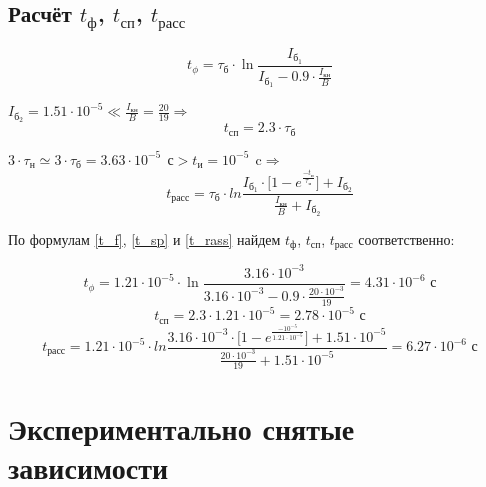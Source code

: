 \subsection{Расчёт $t_\text{ф}$, $t_\text{сп}$, $t_\text{расс}$}

\begin{equation}
\label{t_f}
t_\phi = \tau_{\text{б}} \cdot \ln{\frac{I_{\text{б}_1}}{I_{\text{б}_1} - 0.9 \cdot \frac{I_\text{кн}}{B}}}
\end{equation}

$I_{\text{б}_2} = 1.51 \cdot 10^{-5} \ll \frac{I_\text{кн}}{B} = \frac{20}{19} \Rightarrow$
\begin{equation}
\label{t_sp}
t_\text{сп} = 2.3 \cdot \tau_\text{б}
\end{equation}

$3 \cdot \tau_\text{н} \simeq 3 \cdot \tau_{\text{б}} = 3.63 \cdot 10^{-5}\ \ \text{с} > t_\text{и} = 10^{-5}\ \ \text{c} \Rightarrow$
\begin{equation}
\label{t_rass}
t_\text{расс} = \tau_{\text{б}} \cdot ln{\frac{I_{\text{б}_1} \cdot \Big [ 1 - e^{\frac{-t_\text{и}}{\tau_\text{н}}} \Big ] + I_{\text{б}_2}}{\frac{I_\text{кн}}{B} + I_{\text{б}_2}}}
\end{equation}

По формулам \ref{t_f}, \ref{t_sp} и \ref{t_rass} найдем $t_\text{ф}$, $t_\text{сп}$, $t_\text{расс}$ соответственно:

\begin{displaymath}
t_\phi = 1.21 \cdot 10^{-5} \cdot \ln{\frac{3.16 \cdot 10^{-3}}{3.16 \cdot 10^{-3} - 0.9 \cdot \frac{20 \cdot 10^{-3}}{19}}} = 4.31 \cdot 10^{-6} \text{ с}
\end{displaymath}
\begin{displaymath}
t_\text{сп} = 2.3 \cdot 1.21 \cdot 10^{-5} = 2.78 \cdot 10^{-5} \text{ с}
\end{displaymath}
\begin{displaymath}
t_\text{расс} = 1.21 \cdot 10^{-5} \cdot ln{\frac{3.16 \cdot 10^{-3} \cdot \Big [ 1 - e^{\frac{-10^{-5}}{1.21 \cdot 10^{-5}}} \Big ] + 1.51 \cdot 10^{-5}}{\frac{20 \cdot 10^{-3}}{19} + 1.51 \cdot 10^{-5}}} = 6.27 \cdot 10^{-6} \text{ с}
\end{displaymath}


\section{Экспериментально снятые зависимости}

